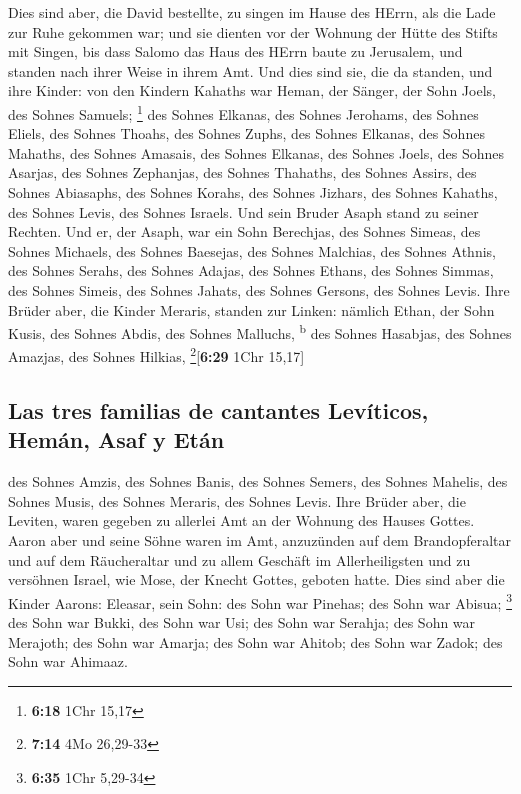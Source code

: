  Dies sind aber, die David bestellte, zu singen im Hause
des HErrn, als die Lade zur Ruhe gekommen war;  und sie
dienten vor der Wohnung der Hütte des Stifts mit Singen, bis dass Salomo
das Haus des HErrn baute zu Jerusalem, und standen nach ihrer Weise in
ihrem Amt.  Und dies sind sie, die da standen, und ihre
Kinder: von den Kindern Kahaths war Heman, der Sänger, der Sohn Joels,
des Sohnes Samuels; \footnote{\textbf{6:18} 1Chr 15,17} 
des Sohnes Elkanas, des Sohnes Jerohams, des Sohnes Eliels, des Sohnes
Thoahs,  des Sohnes Zuphs, des Sohnes Elkanas, des Sohnes
Mahaths, des Sohnes Amasais,  des Sohnes Elkanas, des
Sohnes Joels, des Sohnes Asarjas, des Sohnes Zephanjas, 
des Sohnes Thahaths, des Sohnes Assirs, des Sohnes Abiasaphs, des Sohnes
Korahs,  des Sohnes Jizhars, des Sohnes Kahaths, des
Sohnes Levis, des Sohnes Israels.  Und sein Bruder Asaph
stand zu seiner Rechten. Und er, der Asaph, war ein Sohn Berechjas, des
Sohnes Simeas,  des Sohnes Michaels, des Sohnes Baesejas,
des Sohnes Malchias,  des Sohnes Athnis, des Sohnes
Serahs, des Sohnes Adajas,  des Sohnes Ethans, des Sohnes
Simmas, des Sohnes Simeis,  des Sohnes Jahats, des Sohnes
Gersons, des Sohnes Levis.  Ihre Brüder aber, die Kinder
Meraris, standen zur Linken: nämlich Ethan, der Sohn Kusis, des Sohnes
Abdis, des Sohnes Malluchs, \textsuperscript{b}  des
Sohnes Hasabjas, des Sohnes Amazjas, des Sohnes Hilkias,
\footnote{\textbf{7:14} 4Mo 26,29-33}{[}\textbf{6:29} 1Chr 15,17{]}

\hypertarget{las-tres-familias-de-cantantes-levuxedticos-hemuxe1n-asaf-y-etuxe1n}{%
\subsection{Las tres familias de cantantes Levíticos, Hemán, Asaf y
Etán}\label{las-tres-familias-de-cantantes-levuxedticos-hemuxe1n-asaf-y-etuxe1n}}

 des Sohnes Amzis, des Sohnes Banis, des Sohnes Semers,
 des Sohnes Mahelis, des Sohnes Musis, des Sohnes
Meraris, des Sohnes Levis.  Ihre Brüder aber, die
Leviten, waren gegeben zu allerlei Amt an der Wohnung des Hauses Gottes.
 Aaron aber und seine Söhne waren im Amt, anzuzünden auf
dem Brandopferaltar und auf dem Räucheraltar und zu allem Geschäft im
Allerheiligsten und zu versöhnen Israel, wie Mose, der Knecht Gottes,
geboten hatte.  Dies sind aber die Kinder Aarons:
Eleasar, sein Sohn: des Sohn war Pinehas; des Sohn war Abisua;
\footnote{\textbf{6:35} 1Chr 5,29-34}  des Sohn war
Bukki, des Sohn war Usi; des Sohn war Serahja;  des Sohn
war Merajoth; des Sohn war Amarja; des Sohn war Ahitob; 
des Sohn war Zadok; des Sohn war Ahimaaz.

